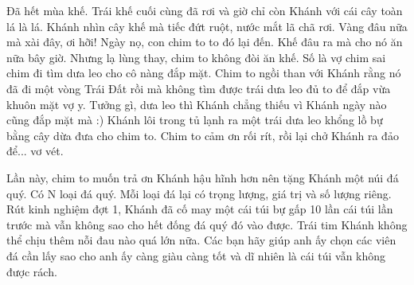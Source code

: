 Đã hết mùa khế. Trái khế cuối cùng đã rơi và giờ chỉ còn Khánh với cái cây toàn lá là lá. Khánh nhìn cây khế mà tiếc đứt ruột, nước mắt lã chã rơi. Vàng đâu nữa mà xài đây, ơi hỡi! Ngày nọ, con chim to to đó lại đến. Khế đâu ra mà cho nó ăn nữa bây giờ. Nhưng lạ lùng thay, chim to không đòi ăn khế. Số là vợ chim sai chim đi tìm dưa leo cho cô nàng đắp mặt. Chim to ngồi than với Khánh rằng nó đã đi một vòng Trái Đất rồi mà không tìm được trái dưa leo đủ to để đắp vừa khuôn mặt vợ y. Tưởng gì, dưa leo thì Khánh chẳng thiếu vì Khánh ngày nào cũng đắp mặt mà :) Khánh lôi trong tủ lạnh ra một trái dưa leo khổng lồ bự bằng cây dừa đưa cho chim to. Chim to cảm ơn rối rít, rồi lại chở Khánh ra đảo để... vơ vét.  

   Lần này, chim to muốn trả ơn Khánh hậu hĩnh hơn nên tặng Khánh một núi đá quý. Có N loại đá quý. Mỗi loại đá lại có trọng lượng, giá trị và số lượng riêng. Rút kinh nghiệm đợt 1, Khánh đã cố may một cái túi bự gấp 10 lần cái túi lần trước mà vẫn không sao cho hết đống đá quý đó vào được. Trái tim Khánh không thể chịu thêm nỗi đau nào quá lớn nữa. Các bạn hãy giúp anh ấy chọn các viên đá cần lấy sao cho anh ấy càng giàu càng tốt và dĩ nhiên là cái túi vẫn không được rách.  

\